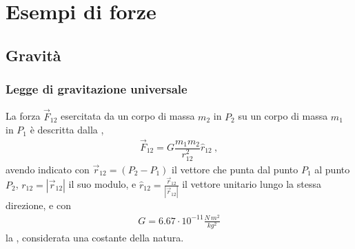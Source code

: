 \documentclass[letterpaper,10pt,italian]{jupyterBook}
\begin{document}
\section{Esempi di forze}
\label{\detokenize{ch/mechanics/actions-examples:esempi-di-forze}}\label{\detokenize{ch/mechanics/actions-examples:physics-hs-mechanics-actions-examples}}\label{\detokenize{ch/mechanics/actions-examples::doc}}

\subsection{Gravità}
\label{\detokenize{ch/mechanics/actions-examples:gravita}}\label{\detokenize{ch/mechanics/actions-examples:physics-hs-mechanics-actions-gravitation}}

\subsubsection{Legge di gravitazione universale}
\label{\detokenize{ch/mechanics/actions-examples:legge-di-gravitazione-universale}}\label{\detokenize{ch/mechanics/actions-examples:physics-hs-mechanics-actions-gravitation-newton}}
\sphinxAtStartPar
La forza \(\vec{F}_{12}\) esercitata da un corpo di massa \(m_2\) in \(P_2\) su un corpo di massa \(m_1\) in \(P_1\) è descritta dalla ,
\begin{equation*}
\begin{split}\vec{F}_{12} = G \dfrac{m_1 m_2}{r_{12}^2} \hat{r}_{12} \ ,\end{split}
\end{equation*}
\sphinxAtStartPar
avendo indicato con \(\vec{r}_{12} = (P_2 - P_1)\) il vettore che punta dal punto \(P_1\) al punto \(P_2\), \(r_{12} = |\vec{r}_{12}|\) il suo modulo, e \(\hat{r}_{12} = \frac{\vec{r}_{12}}{|\vec{r}_{12}|}\) il vettore unitario lungo la stessa direzione, e con
\begin{equation*}
\begin{split}G = 6.67 \cdot 10^{-11} \frac{N \, m^2}{kg^2}\end{split}
\end{equation*}
\sphinxAtStartPar
la , considerata una costante della natura. 
\end{document}
